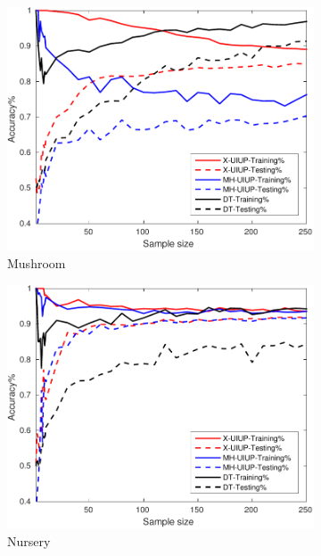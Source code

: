 \begin{figure}[ht]
	\\
  \begin{subfigure}[b]{0.3\textwidth}
		\centering
  	\includegraphics[width=\textwidth]{figs/PLPTF/Trees/MushroomDownsampled_Trees_X_MH.pdf}
  	\caption{Mushroom}
		\label{fig:Mush1}
	\end{subfigure}
  \begin{subfigure}[b]{0.3\textwidth}
		\centering
  	\includegraphics[width=\textwidth]{figs/PLPTF/Trees/NurseryDownsampledFurther_Trees_X_MH.pdf}
  	\caption{Nursery}
		\label{fig:N1}
	\end{subfigure}
  \begin{subfigure}[b]{0.3\textwidth}

\end{subfigure}
\end{figure}

